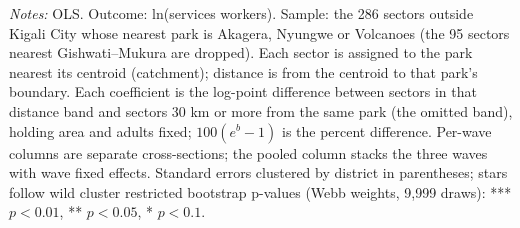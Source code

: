 \documentclass[11pt]{article}
\begin{document}
\begin{table}[H]
\begin{minipage}{0.97\textwidth}
\textit{Notes:} OLS. Outcome: ln(services workers). Sample: the 286 sectors outside Kigali City whose nearest park is Akagera, Nyungwe or Volcanoes (the 95 sectors nearest Gishwati--Mukura are dropped). Each sector is assigned to the park nearest its centroid (catchment); distance is from the centroid to that park's boundary. Each coefficient is the log-point difference between sectors in that distance band and sectors 30 km or more from the same park (the omitted band), holding area and adults fixed; $100(e^{b}-1)$ is the percent difference. Per-wave columns are separate cross-sections; the pooled column stacks the three waves with wave fixed effects. Standard errors clustered by district in parentheses; stars follow wild cluster restricted bootstrap p-values (Webb weights, 9,999 draws): *** $p<0.01$, ** $p<0.05$, * $p<0.1$.
\end{minipage}
\end{table}
\clearpage
\end{document}
